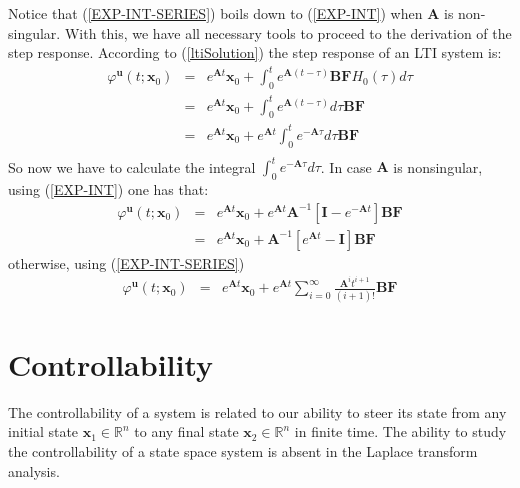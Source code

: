 \documentclass[a4paper,10pt,oneside]{book}
\begin{document}
Notice that (\ref{EXP-INT-SERIES}) boils down to (\ref{EXP-INT}) when $\mathbf{A}$ is non-singular. With this, we have all necessary tools to proceed to the derivation of the step response. According to (\ref{ltiSolution}) the step response of an LTI system is:
\begin{eqnarray}
 \varphi^{\mathbf{u}}(t;\mathbf{x}_0)&=&e^{\mathbf{A}t}\mathbf{x}_0+\int_0^t e^{\mathbf{A}(t-\tau)}\mathbf{BF}H_0(\tau)d\tau\\
				     &=&e^{\mathbf{A}t}\mathbf{x}_0+\int_0^t e^{\mathbf{A}(t-\tau)}d\tau\mathbf{BF}\\
				     &=&e^{\mathbf{A}t}\mathbf{x}_0+e^{\mathbf{A}t}\int_0^t e^{-\mathbf{A}\tau}d\tau\mathbf{BF}\\
\end{eqnarray}
So now we have to calculate the integral $\int_0^t e^{-\mathbf{A}\tau}d\tau$. In case $\mathbf{A}$ is nonsingular, using (\ref{EXP-INT}) one has that:
\begin{eqnarray}
 \varphi^{\mathbf{u}}(t;\mathbf{x}_0)&=&e^{\mathbf{A}t}\mathbf{x}_0+e^{\mathbf{A}t}\mathbf{A}^{-1}\left[\mathbf{I}-e^{-\mathbf{A}t}\right]\mathbf{BF}\\
&=&e^{\mathbf{A}t}\mathbf{x}_0+\mathbf{A}^{-1}\left[e^{\mathbf{A}t}-\mathbf{I}\right]\mathbf{BF}
\end{eqnarray}
otherwise, using (\ref{EXP-INT-SERIES})
\begin{eqnarray}
 \varphi^{\mathbf{u}}(t;\mathbf{x}_0)&=&e^{\mathbf{A}t}\mathbf{x}_0+e^{\mathbf{A}t}\sum_{i=0}^{\infty}{\frac{\mathbf{A}^i t^{i+1}}{(i+1)!}}\mathbf{BF}
\end{eqnarray}
\chapter{Controllability}
The controllability of a system is related to our ability to steer its state from any initial state $\mathbf{x}_1\in\mathbb{R}^n$ to any final state $\mathbf{x}_2\in\mathbb{R}^n$ in finite time. The ability to study the controllability of a state space system is absent in the Laplace transform analysis.
\end{document}
